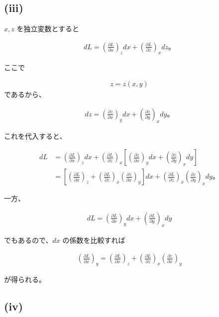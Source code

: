 \documentclass[platex,dvipdfmx,a4paper]{jsarticle}
\begin{document}
\subsection{(iii)}

$x,z$ を独立変数とすると

\begin{align*}
dL
=
\left(\frac{\partial L}{\partial x}\right)_z dx
+
\left(\frac{\partial L}{\partial z}\right)_x dz。
\end{align*}

ここで

\begin{align*}
z=z(x,y)
\end{align*}
であるから、

\begin{align*}
dz
=
\left(\frac{\partial z}{\partial x}\right)_y dx
+
\left(\frac{\partial z}{\partial y}\right)_x dy。
\end{align*}

これを代入すると、

\begin{align*}
dL
&=
\left(\frac{\partial L}{\partial x}\right)_z dx
+
\left(\frac{\partial L}{\partial z}\right)_x
\left[
\left(\frac{\partial z}{\partial x}\right)_y dx
+
\left(\frac{\partial z}{\partial y}\right)_x dy
\right] \\
&=
\left[
\left(\frac{\partial L}{\partial x}\right)_z
+
\left(\frac{\partial L}{\partial z}\right)_x
\left(\frac{\partial z}{\partial x}\right)_y
\right]dx
+
\left(\frac{\partial L}{\partial z}\right)_x
\left(\frac{\partial z}{\partial y}\right)_x dy。
\end{align*}

一方、

\begin{align*}
dL
=
\left(\frac{\partial L}{\partial x}\right)_y dx
+
\left(\frac{\partial L}{\partial y}\right)_x dy
\end{align*}

でもあるので、$dx$ の係数を比較すれば

\begin{align*}
\left(\frac{\partial L}{\partial x}\right)_y
=
\left(\frac{\partial L}{\partial x}\right)_z
+
\left(\frac{\partial L}{\partial z}\right)_x
\left(\frac{\partial z}{\partial x}\right)_y
\end{align*}

が得られる。

\subsection{(iv)}
\end{document}
